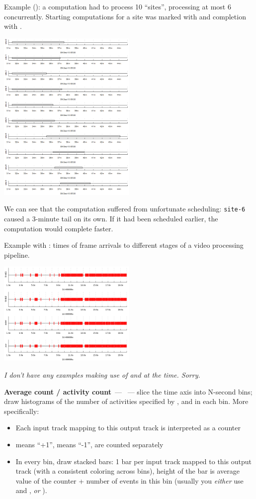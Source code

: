 \documentclass{article}
\begin{document}
Example (): a computation had to process 10 ``sites'', processing at most 6 concurrently. Starting computations for a site was marked with  and completion with .

\centerline{\includegraphics[width=0.5\textwidth]{pics/tplot/event.png}}

We can see that the computation suffered from unfortunate scheduling: \texttt{site-6} caused a 3-minute tail on its own. If it had been scheduled earlier, the computation would complete faster.

\pagebreak
Example with : times of frame arrivals to different stages of a video processing pipeline.

\centerline{\includegraphics[width=0.5\textwidth]{pics/tplot/thedeemon-event.png}}

\emph{I don't have any examples making use of  and  at the time. Sorry.}

\pagebreak
\noindent
\textbf{Average count / activity count}~--- ~--- slice the time axis into N-second bins; draw histograms of the number of activities specified by \hlverb{>}, \hlverb{<} and \hlverb{!} in each bin. More specifically:
\begin{itemize}
 \item Each input track mapping to this output track is interpreted as a counter
 \item \hlverb{>} means ``+1'', \hlverb{<} means ``-1'', \hlverb{!} are counted separately
 \item In every bin, draw stacked bars: 1 bar per input track mapped to this output track (with a consistent coloring across bins), height of the bar is average value of the counter + number of \hlverb{!} events in this bin (usually you \emph{either} use \hlverb{>} and \hlverb{<}, \emph{or} \hlverb{!}).
\end{itemize}
\end{document}
